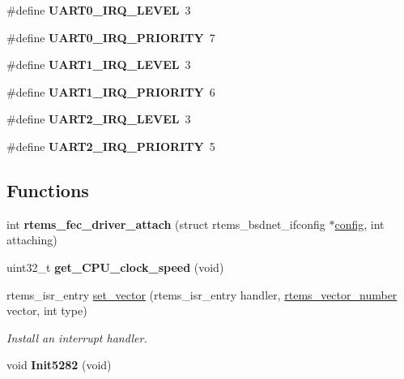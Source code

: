 \begin{DoxyCompactItemize}
\#define {\bfseries U\+A\+R\+T0\+\_\+\+I\+R\+Q\+\_\+\+L\+E\+V\+EL}~3
\item 
\mbox{\label{group__RTEMSBSPsM68kAV5282_ga421617dbbfc69fbbe3e88835e4c26dc5}} 
\#define {\bfseries U\+A\+R\+T0\+\_\+\+I\+R\+Q\+\_\+\+P\+R\+I\+O\+R\+I\+TY}~7
\item 
\mbox{\label{group__RTEMSBSPsM68kAV5282_ga8db7b2e20155ab9adf447660e92010b1}} 
\#define {\bfseries U\+A\+R\+T1\+\_\+\+I\+R\+Q\+\_\+\+L\+E\+V\+EL}~3
\item 
\mbox{\label{group__RTEMSBSPsM68kAV5282_gafa24779091dd9f575af1f8482cea5b2a}} 
\#define {\bfseries U\+A\+R\+T1\+\_\+\+I\+R\+Q\+\_\+\+P\+R\+I\+O\+R\+I\+TY}~6
\item 
\mbox{\label{group__RTEMSBSPsM68kAV5282_ga4fa66263959fe836ffc8cc89554a22e7}} 
\#define {\bfseries U\+A\+R\+T2\+\_\+\+I\+R\+Q\+\_\+\+L\+E\+V\+EL}~3
\item 
\mbox{\label{group__RTEMSBSPsM68kAV5282_gabe7562294780b56d1dd0e8cc91df557e}} 
\#define {\bfseries U\+A\+R\+T2\+\_\+\+I\+R\+Q\+\_\+\+P\+R\+I\+O\+R\+I\+TY}~5
\end{DoxyCompactItemize}
\subsection*{Functions}
\begin{DoxyCompactItemize}
\item 
\mbox{\label{group__RTEMSBSPsM68kAV5282_ga584ad500075555d3cd0a4f895d73df04}} 
int {\bfseries rtems\+\_\+fec\+\_\+driver\+\_\+attach} (struct rtems\+\_\+bsdnet\+\_\+ifconfig $\ast$\mbox{\hyperlink{structconfig__s}{config}}, int attaching)
\item 
\mbox{\label{group__RTEMSBSPsM68kAV5282_gaac0f9f3f7c56eaee7f0d4ddcca226d24}} 
uint32\+\_\+t {\bfseries get\+\_\+\+C\+P\+U\+\_\+clock\+\_\+speed} (void)
\item 
rtems\+\_\+isr\+\_\+entry \mbox{\hyperlink{group__RTEMSBSPsM68kAV5282_gab3388042c56b34c40be81fd5f028d97e}{set\+\_\+vector}} (rtems\+\_\+isr\+\_\+entry handler, \mbox{\hyperlink{group__ClassicINTR_ga3e434c197d99f128e78cae4d9358bd8b}{rtems\+\_\+vector\+\_\+number}} vector, int type)
\begin{DoxyCompactList}\small\item\em Install an interrupt handler. \end{DoxyCompactList}\item 
\mbox{\label{group__RTEMSBSPsM68kAV5282_gaa2bf781e6e527beef83ef3e365afb300}} 
void {\bfseries Init5282} (void)
\end{DoxyCompactItemize}


